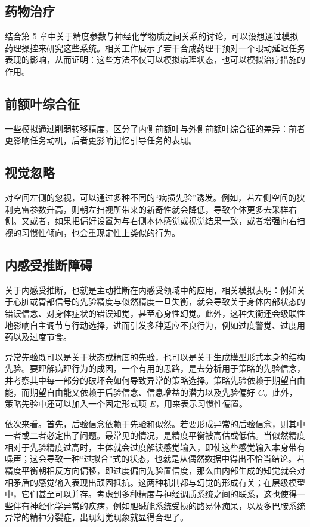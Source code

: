 \subsection*{药物治疗}

结合第 5 章中关于精度参数与神经化学物质之间关系的讨论，可以设想通过模拟药理操控来研究这些系统。相关工作展示了若干合成药理干预对一个眼动延迟任务表现的影响，从而证明：这些方法不仅可以模拟病理状态，也可以模拟治疗措施的作用。

\subsection*{前额叶综合征}

一些模拟通过削弱转移精度，区分了内侧前额叶与外侧前额叶综合征的差异：前者更影响任务动机，后者更影响记忆引导任务的表现。

\subsection*{视觉忽略}

对空间左侧的忽视，可以通过多种不同的“病损先验”诱发。例如，若左侧空间的狄利克雷参数升高，则朝左扫视所带来的新奇性就会降低，导致个体更多去采样右侧。又或者，如果把偏好设置为与右侧本体感觉或视觉结果一致，或者增强向右扫视的习惯性倾向，也会重现定性上类似的行为。

\subsection*{内感受推断障碍}

关于内感受推断，也就是主动推断在内感受领域中的应用，相关模拟表明：例如关于心脏或胃部信号的先验精度与似然精度一旦失衡，就会导致关于身体内部状态的错误信念、对身体症状的错误知觉，甚至心身性幻觉。此外，这种失衡还会级联性地影响自主调节与行动选择，进而引发多种适应不良行为，例如过度警觉、过度用药以及过度节食。

异常先验既可以是关于状态或精度的先验，也可以是关于生成模型形式本身的结构先验。要理解病理行为的成因，一个有用的思路，是去分析用于策略的先验信念，并考察其中每一部分的破坏会如何导致异常的策略选择。策略先验依赖于期望自由能，而期望自由能又依赖于后验信念、信息增益的潜力以及先验偏好 $C$。此外，策略先验中还可以加入一个固定形式项 $E$，用来表示习惯性偏置。

依次来看。首先，后验信念依赖于先验和似然。若要形成异常的后验信念，则其中一者或二者必定出了问题。最常见的情况，是精度平衡被高估或低估。当似然精度相对于先验精度过高时，主体就会过度解读感觉输入，即使这些感觉输入本身带有噪声；这会导致一种“过拟合”式的状态，也就是从偶然数据中得出不恰当结论。若精度平衡朝相反方向偏移，即过度偏向先验置信度，那么由内部生成的知觉就会对相矛盾的感觉输入表现出顽固抵抗。这两种机制都与幻觉的形成有关；在层级模型中，它们甚至可以并存。考虑到多种精度与神经调质系统之间的联系，这也使得一些伴有神经化学异常的疾病，例如胆碱能系统受损的路易体痴呆，以及多巴胺系统异常的精神分裂症，出现幻觉现象就显得合理了。

